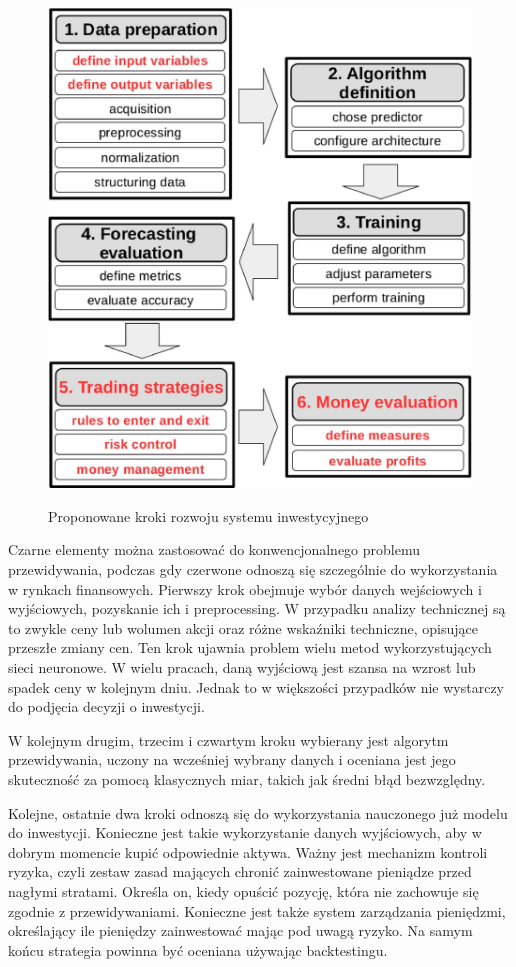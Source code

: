 \documentclass[twoside]{iisthesis}
\begin{document}
\begin{figure}[h]
\caption{Proponowane kroki rozwoju systemu inwestycyjnego}
\centering
\includegraphics{metodyka.jpg}
\label{fig:metodyka}
\end{figure}

Czarne elementy można zastosować do konwencjonalnego problemu przewidywania, podczas gdy czerwone odnoszą się szczególnie do wykorzystania w rynkach finansowych. Pierwszy krok obejmuje wybór danych wejściowych i wyjściowych, pozyskanie ich i preprocessing. W przypadku analizy technicznej są to zwykle ceny lub wolumen akcji oraz różne wskaźniki techniczne, opisujące przeszłe zmiany cen. Ten krok ujawnia problem wielu metod wykorzystujących sieci neuronowe. W wielu pracach, daną wyjściową jest szansa na wzrost lub spadek ceny w kolejnym dniu. Jednak to w większości przypadków nie wystarczy do podjęcia decyzji o inwestycji.

W kolejnym drugim, trzecim i czwartym kroku wybierany jest algorytm przewidywania, uczony na wcześniej wybrany danych i oceniana jest jego skuteczność za pomocą klasycznych miar, takich jak średni błąd bezwzględny.

Kolejne, ostatnie dwa kroki odnoszą się do wykorzystania nauczonego już modelu do inwestycji. Konieczne jest takie wykorzystanie danych wyjściowych, aby w dobrym momencie kupić odpowiednie aktywa. Ważny jest mechanizm kontroli ryzyka, czyli zestaw zasad mających chronić zainwestowane pieniądze przed nagłymi stratami. Określa on, kiedy opuścić pozycję, która nie zachowuje się zgodnie z przewidywaniami. Konieczne jest także system zarządzania pieniędzmi, określający ile pieniędzy zainwestować mając pod uwagą ryzyko. Na samym końcu strategia powinna być oceniana używając backtestingu. 
\end{document}
